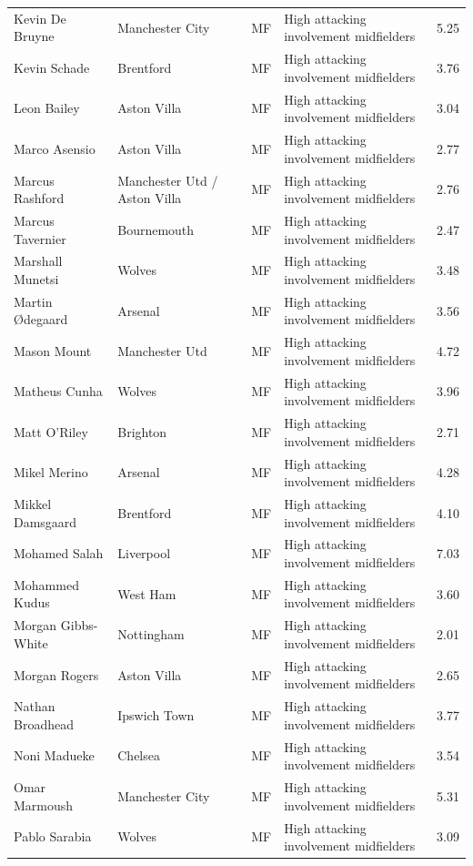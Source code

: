 \begin{longtable}{p{3.4cm}p{2.5cm}p{1.0cm}p{5.0cm}r}
Kevin De Bruyne & Manchester City & MF & High attacking involvement midfielders & 5.25 \\
Kevin Schade & Brentford & MF & High attacking involvement midfielders & 3.76 \\
Leon Bailey & Aston Villa & MF & High attacking involvement midfielders & 3.04 \\
Marco Asensio & Aston Villa & MF & High attacking involvement midfielders & 2.77 \\
Marcus Rashford & Manchester Utd / Aston Villa & MF & High attacking involvement midfielders & 2.76 \\
Marcus Tavernier & Bournemouth & MF & High attacking involvement midfielders & 2.47 \\
Marshall Munetsi & Wolves & MF & High attacking involvement midfielders & 3.48 \\
Martin Ødegaard & Arsenal & MF & High attacking involvement midfielders & 3.56 \\
Mason Mount & Manchester Utd & MF & High attacking involvement midfielders & 4.72 \\
Matheus Cunha & Wolves & MF & High attacking involvement midfielders & 3.96 \\
Matt O'Riley & Brighton & MF & High attacking involvement midfielders & 2.71 \\
Mikel Merino & Arsenal & MF & High attacking involvement midfielders & 4.28 \\
Mikkel Damsgaard & Brentford & MF & High attacking involvement midfielders & 4.10 \\
Mohamed Salah & Liverpool & MF & High attacking involvement midfielders & 7.03 \\
Mohammed Kudus & West Ham & MF & High attacking involvement midfielders & 3.60 \\
Morgan Gibbs-White & Nottingham & MF & High attacking involvement midfielders & 2.01 \\
Morgan Rogers & Aston Villa & MF & High attacking involvement midfielders & 2.65 \\
Nathan Broadhead & Ipswich Town & MF & High attacking involvement midfielders & 3.77 \\
Noni Madueke & Chelsea & MF & High attacking involvement midfielders & 3.54 \\
Omar Marmoush & Manchester City & MF & High attacking involvement midfielders & 5.31 \\
Pablo Sarabia & Wolves & MF & High attacking involvement midfielders & 3.09 \\

\end{longtable}
